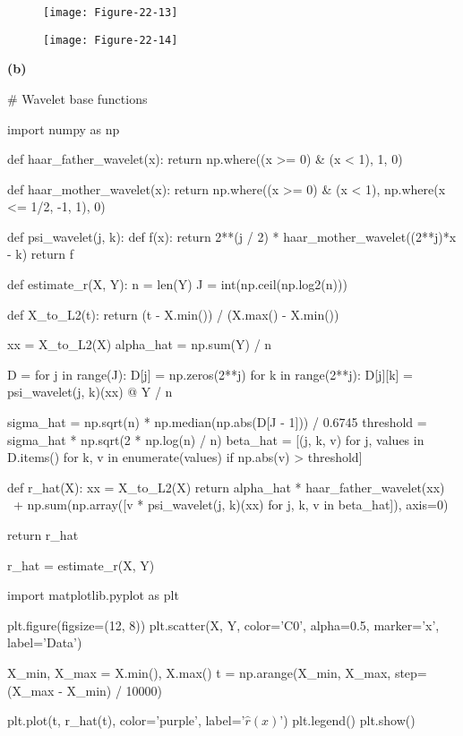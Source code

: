 \begin{figure}[H]
\centering
\texttt{[image: Figure-22-13]}
\end{figure}

\begin{figure}[H]
\centering
\texttt{[image: Figure-22-14]}
\end{figure}

\textbf{(b)}

\begin{python}
# Wavelet base functions

import numpy as np

def haar_father_wavelet(x):
    return np.where((x >= 0) & (x < 1), 1, 0)

def haar_mother_wavelet(x):
    return np.where((x >= 0) & (x < 1),  np.where(x <= 1/2, -1, 1), 0)

def psi_wavelet(j, k):
    def f(x):
        return 2**(j / 2) * haar_mother_wavelet((2**j)*x - k)
    return f
\end{python}

\begin{python}
def estimate_r(X, Y):
    n = len(Y)
    J = int(np.ceil(np.log2(n)))

    def X_to_L2(t):
        return (t - X.min()) / (X.max() - X.min())

    xx = X_to_L2(X)
    alpha_hat = np.sum(Y) / n

    D = {}
    for j in range(J):
        D[j] = np.zeros(2**j)
        for k in range(2**j):
            D[j][k] = psi_wavelet(j, k)(xx) @ Y / n

    sigma_hat = np.sqrt(n) * np.median(np.abs(D[J - 1])) / 0.6745
    threshold = sigma_hat * np.sqrt(2 * np.log(n) / n)
    beta_hat = [(j, k, v) for j, values in D.items() for k, v in enumerate(values) if np.abs(v) > threshold]

    def r_hat(X):
        xx = X_to_L2(X)
        return alpha_hat * haar_father_wavelet(xx) \
            + np.sum(np.array([v * psi_wavelet(j, k)(xx) for j, k, v in beta_hat]), axis=0)
    
    return r_hat
\end{python}

\begin{python}
r_hat = estimate_r(X, Y)
\end{python}

\begin{python}
import matplotlib.pyplot as plt

plt.figure(figsize=(12, 8))
plt.scatter(X, Y, color='C0', alpha=0.5, marker='x', label='Data')

X_min, X_max = X.min(), X.max()
t = np.arange(X_min, X_max, step=(X_max - X_min) / 10000)

plt.plot(t, r_hat(t), color='purple', label='$\hat{r}(x)$')
plt.legend()
plt.show()
\end{python}

